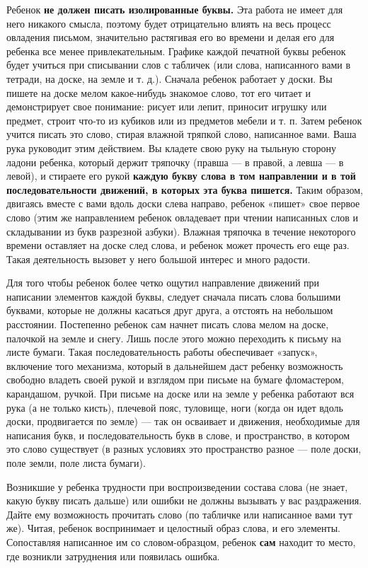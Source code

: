 \documentclass{book}
\begin{document}
Ребенок \textbf{не должен писать изолированные буквы.} Эта работа не
имеет для него никакого смысла, поэтому будет отрицательно влиять на
весь процесс овладения письмом, значительно растягивая его во времени и
делая его для ребенка все менее привлекательным. Графике каждой печатной
буквы ребенок будет учиться при списывании слов с табличек (или слова,
написанного вами в тетради, на доске, на земле и т. д.). Сначала ребенок
работает у доски. Вы пишете на доске мелом какое-нибудь знакомое слово,
тот его читает и демонстрирует свое понимание: рисует или лепит,
приносит игрушку или предмет, строит что-то из кубиков или из предметов
мебели и т. п. Затем ребенок учится писать это слово, стирая влажной
тряпкой слово, написанное вами. Ваша рука руководит этим действием. Вы
кладете свою руку на тыльную сторону ладони ребенка, который держит
тряпочку (правша --- в правой, а левша --- в левой), и стираете его
рукой \textbf{каждую букву слова в том направлении и в той
последовательности движений, в которых эта буква пишется.} Таким
образом, двигаясь вместе с вами вдоль доски слева направо, ребенок
«пишет» свое первое слово (этим же направлением ребенок овладевает при
чтении написанных слов и складывании из букв разрезной азбуки). Влажная
тряпочка в течение некоторого времени оставляет на доске след слова, и
ребенок может прочесть его еще раз. Такая деятельность вызовет у него
большой интерес и много радости.

Для того чтобы ребенок более четко ощутил направление движений при
написании элементов каждой буквы, следует сначала писать слова большими
буквами, которые не должны касаться друг друга, а отстоять на небольшом
расстоянии. Постепенно ребенок сам начнет писать слова мелом на доске,
палочкой на земле и снегу. Лишь после этого можно переходить к письму на
листе бумаги. Такая последовательность работы обеспечивает «запуск»,
включение того механизма, который в дальнейшем даст ребенку возможность
свободно владеть своей рукой и взглядом при письме на бумаге
фломастером, карандашом, ручкой. При письме на доске или на земле у
ребенка работают вся рука (а не только кисть), плечевой пояс, туловище,
ноги (когда он идет вдоль доски, продвигается по земле) --- так он
осваивает и движения, необходимые для написания букв, и
последовательность букв в слове, и пространство, в котором это слово
существует (в разных условиях это пространство разное --- поле доски,
поле земли, поле листа бумаги).

Возникшие у ребенка трудности при воспроизведении состава слова (не
знает, какую букву писать дальше) или ошибки не должны вызывать у вас
раздражения. Дайте ему возможность прочитать слово (по табличке или
написанное вами тут же). Читая, ребенок воспринимает и целостный образ
слова, и его элементы. Сопоставляя написанное им со словом-образцом,
ребенок \textbf{сам} находит то место, где возникли затруднения или
появилась ошибка.
\end{document}
